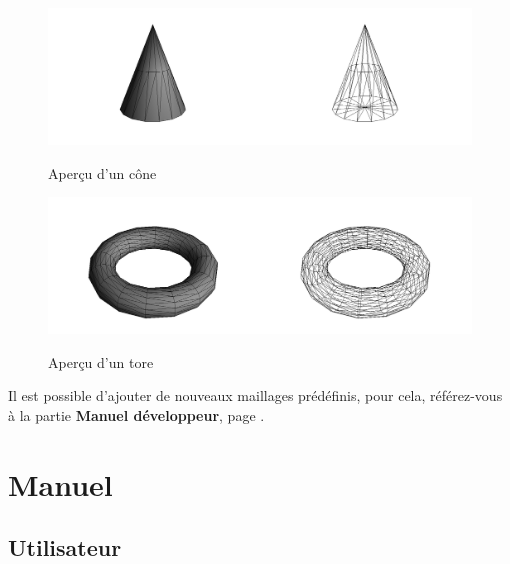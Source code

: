 \documentclass[a4paper]{memoir}
\begin{document}
			\begin{figure}[H]
				\hspace{-2cm} \includegraphics[scale=0.27]{img/cone.png}
				\label{fig:interface}
				\caption{Aperçu d'un cône}
			\end{figure}
			\begin{figure}[H]
				\vspace{-0,5cm} \hspace{-2cm} \includegraphics[scale=0.27]{img/torus.png}
				\label{fig:interface}
				\caption{Aperçu d'un tore}
			\end{figure}
			Il est possible d'ajouter de nouveaux maillages prédéfinis, pour cela, référez-vous à la partie \textbf{Manuel développeur}, page 
			\pageref{man-dev}.

	\chapter{Manuel}
		
		\section{Utilisateur}
\end{document}
